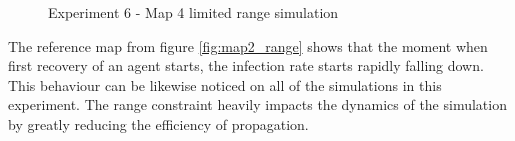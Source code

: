 \begin{figure}[H]
    \centering

    \hspace*{\fill}
    \hspace*{\fill}

    \caption{Experiment 6 - Map 4 limited range simulation}\label{fig:map4_range}
\end{figure}

The reference map from figure \ref{fig:map2_range} shows that the moment when first recovery of an agent starts, the infection rate starts rapidly falling down.
This behaviour can be likewise noticed on all of the simulations in this experiment.
The range constraint heavily impacts the dynamics of the simulation by greatly reducing the efficiency of propagation.

